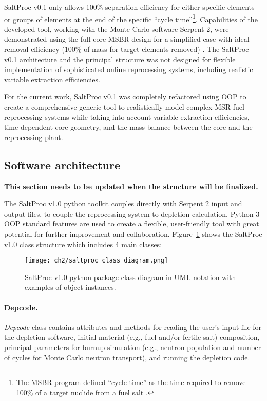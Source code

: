 SaltProc v0.1 only allows 100\% separation efficiency for either specific 
elements or groups of elements at the end of the specific ``cycle 
time''\footnote{The \gls{MSBR} program defined ``cycle time'' as the time 
required to remove 100\% of a target nuclide from a fuel salt  
\cite{robertson_conceptual_1971}.}. Capabilities of the developed tool, 
working with the Monte Carlo software Serpent 2, were demonstrated using the 
full-core MSBR design for a simplified case with ideal removal efficiency 
(100\% of mass for target elements removed) \cite{rykhlevskii_modeling_2019}. 
The SaltProc v0.1 architecture and the principal structure was not designed 
for flexible implementation of sophisticated online reprocessing systems, 
including realistic variable extraction efficiencies. 

For the current work, SaltProc v0.1 was completely refactored using \gls{OOP} 
to create a comprehensive generic tool to realistically model complex 
\gls{MSR} fuel reprocessing systems while taking into account variable 
extraction efficiencies, time-dependent core geometry, and the mass balance 
between the core and the reprocessing plant.

\subsection{Software architecture} \textbf{This section needs to be updated 
when the structure will be finalized.}

The SaltProc v1.0 python toolkit couples directly with Serpent 2 input 
and output files, to couple the reprocessing system to depletion calculation. 
Python 3 \gls{OOP} standard features are used to create a flexible, 
user-friendly tool with great potential for further improvement and 
collaboration. Figure~\ref{fig:saltproc_class} shows the SaltProc v1.0 class 
structure which includes 4 main classes:
\begin{figure}[ht!] %
	\texttt{[image: ch2/saltproc\_class\_diagram.png]}
	\vspace{-0.15in}
	\caption{SaltProc v1.0 python package class diagram in UML 
	notation with examples of object instances.}
	\label{fig:saltproc_class}
\end{figure}
\paragraph{Depcode.}\textit{Depcode} class contains attributes and methods for 
reading the user's input file for the depletion software, initial material 
(e.g., fuel and/or fertile salt) composition, principal parameters for burnup 
simulation (e.g., neutron population and number of cycles for Monte Carlo 
neutron transport), and running the depletion code.
